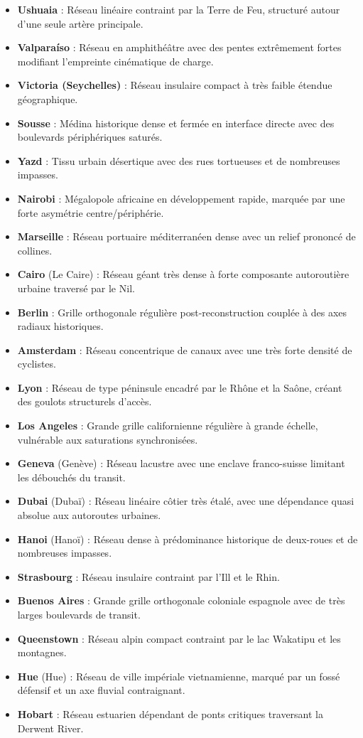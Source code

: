 \documentclass[10pt, a4paper]{article}
\begin{document}
\begin{itemize}
\item
  \textbf{Ushuaia} : Réseau linéaire contraint par la Terre de Feu,
  structuré autour d'une seule artère principale.
\item
  \textbf{Valparaíso} : Réseau en amphithéâtre avec des pentes
  extrêmement fortes modifiant l'empreinte cinématique de charge.
\item
  \textbf{Victoria (Seychelles)} : Réseau insulaire compact à très
  faible étendue géographique.
\item
  \textbf{Sousse} : Médina historique dense et fermée en interface
  directe avec des boulevards périphériques saturés.
\item
  \textbf{Yazd} : Tissu urbain désertique avec des rues tortueuses et de
  nombreuses impasses.
\item
  \textbf{Nairobi} : Mégalopole africaine en développement rapide,
  marquée par une forte asymétrie centre/périphérie.
\item
  \textbf{Marseille} : Réseau portuaire méditerranéen dense avec un
  relief prononcé de collines.
\item
  \textbf{Cairo} (Le Caire) : Réseau géant très dense à forte composante
  autoroutière urbaine traversé par le Nil.
\item
  \textbf{Berlin} : Grille orthogonale régulière post-reconstruction
  couplée à des axes radiaux historiques.
\item
  \textbf{Amsterdam} : Réseau concentrique de canaux avec une très forte
  densité de cyclistes.
\item
  \textbf{Lyon} : Réseau de type péninsule encadré par le Rhône et la
  Saône, créant des goulots structurels d'accès.
\item
  \textbf{Los Angeles} : Grande grille californienne régulière à grande
  échelle, vulnérable aux saturations synchronisées.
\item
  \textbf{Geneva} (Genève) : Réseau lacustre avec une enclave
  franco-suisse limitant les débouchés du transit.
\item
  \textbf{Dubai} (Dubaï) : Réseau linéaire côtier très étalé, avec une
  dépendance quasi absolue aux autoroutes urbaines.
\item
  \textbf{Hanoi} (Hanoï) : Réseau dense à prédominance historique de
  deux-roues et de nombreuses impasses.
\item
  \textbf{Strasbourg} : Réseau insulaire contraint par l'Ill et le Rhin.
\item
  \textbf{Buenos Aires} : Grande grille orthogonale coloniale espagnole
  avec de très larges boulevards de transit.
\item
  \textbf{Queenstown} : Réseau alpin compact contraint par le lac
  Wakatipu et les montagnes.
\item
  \textbf{Hue} (Hue) : Réseau de ville impériale vietnamienne, marqué
  par un fossé défensif et un axe fluvial contraignant.
\item
  \textbf{Hobart} : Réseau estuarien dépendant de ponts critiques
  traversant la Derwent River.
\end{itemize}
\end{document}
